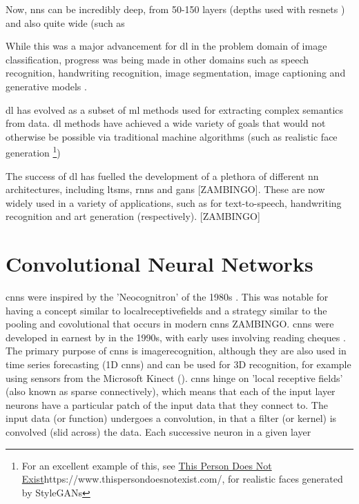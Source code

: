 Now, \gls{nn}s can be incredibly deep, from 50-150 layers (depths used with \gls{resnet}s \cite{resnet}) and also quite wide (such as 


While this was a major advancement for \gls{dl} in the problem domain of image classification, progress was being made in other domains such as speech recognition, handwriting recognition, image segmentation, image captioning and generative models \cite{dl_overview}. 
\bigskip %
 
\gls{dl} has evolved as a subset of \gls{ml} methods used for extracting complex semantics from data. \gls{dl} methods have achieved a wide variety of goals that would not otherwise be possible via traditional machine algorithms (such as realistic face generation \footnote{For an excellent example of this, see \url{This Person Does Not Exist}{https://www.thispersondoesnotexist.com/}, for realistic faces generated by StyleGANs})  \bigskip%

The success of  \gls{dl} has fuelled the development of a plethora of different  \gls{nn} architectures, including \gls{ltsm}s, \gls{rnn}s and \gls{gan}s [ZAMBINGO]. These are now widely used in a variety of applications, such as for text-to-speech, handwriting recognition and art generation (respectively). [ZAMBINGO]  \bigskip 

\section{Convolutional Neural Networks}

\gls{cnn}s were inspired by the 'Neocognitron' of the 1980s \cite{neocognitron_proposal} \cite{neocognitron}. This was notable for having a concept similar to \gls{localreceptivefields} and a strategy similar to the pooling and covolutional that occurs in modern \gls{cnn}s ZAMBINGO. \gls{cnn}s were developed in earnest by in the 1990s, with early uses involving reading cheques \cite{lecun_cheques}. The primary purpose of \gls{cnn}s is \gls{imagerecognition}, although they are also used in time series forecasting (1D \gls{cnn}s) and can be used for 3D recognition, for example using sensors from the Microsoft Kinect (\cite{3d_conv}). \gls{cnn}s hinge on 'local receptive fields' (also known as sparse connectively), which means that each of the input layer neurons have a particular patch of the input data that they connect to. The input data (or function) undergoes a convolution, in that a filter (or kernel) is convolved (slid across) the data. Each successive \gls{neuron} in a given layer \cite[Chapter~5]{good_fellow_2016}

